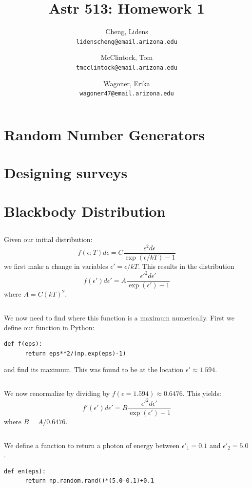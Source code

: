 \documentclass[12pt,a4paper]{article}
\author{
  Cheng, Lidens\\
  \texttt{lidenscheng@email.arizona.edu}
  \and
  McClintock, Tom\\
  \texttt{tmcclintock@email.arizona.edu}
  \and
  Wagoner, Erika\\
  \texttt{wagoner47@email.arizona.edu}
}
\title{Astr 513: Homework 1}
\begin{document}
\maketitle
  
\section{Random Number Generators}

\section{Designing surveys}

\section{Blackbody Distribution}
\subsection{}
Given our initial distribution:
\begin{equation*}
  f(\epsilon;T)d\epsilon = C\frac{\epsilon^2d\epsilon}{\exp{(\epsilon/kT)}-1}
\end{equation*}
we first make a change in variables $\epsilon' = \epsilon/kT$. This results
in the distribution
\begin{equation*}
  f(\epsilon')d\epsilon' = A\frac{\epsilon'^2d\epsilon'}{\exp{(\epsilon')}-1}
\end{equation*}
where $A=C(kT)^2$.
\subsection{}
We now need to find where this function is a maximum numerically. First we
define our function in Python:
\begin{lstlisting}[style=custompython]
  def f(eps):
      return eps**2/(np.exp(eps)-1)
\end{lstlisting}
and find its maximum. This was found to be at the 
location $\epsilon'\approx1.594$.
\subsection{}
We now renormalize by dividing by $f(\epsilon=1.594)\approx0.6476$.
This yields:
\begin{equation*}
  f'(\epsilon')d\epsilon' = B\frac{\epsilon'^2d\epsilon'}{\exp{(\epsilon')}-1}
\end{equation*}
where $B=A/0.6476$.
\subsection{}
We define a function to return a photon of energy between $\epsilon'_1=0.1$
and $\epsilon'_2=5.0$.
\begin{lstlisting}[style=custompython]
  def en(eps):
      return np.random.rand()*(5.0-0.1)+0.1
\end{lstlisting}
\end{document}
